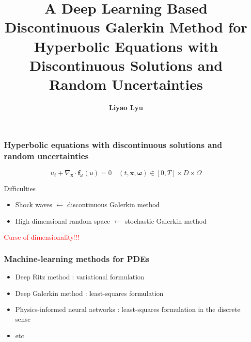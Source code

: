 \documentclass[aspectratio=169]{beamer}
\title[D2GM]{\bfseries A Deep Learning Based  Discontinuous Galerkin Method for Hyperbolic Equations with Discontinuous Solutions and Random Uncertainties}
\author{\textbf{Liyao Lyu }}
\begin{document}
\frame{\titlepage}



\begin{frame}
\frametitle{Hyperbolic equations with discontinuous solutions and random uncertainties}

\begin{equation*}
	u_t +\nabla_{\boldsymbol{x}} \cdot \boldsymbol{f}_{\omega}(u) = 0 \quad  (t,\boldsymbol{x},\boldsymbol{\omega})\in [0,T]\times D\times\Omega 
\end{equation*}


Difficulties
\begin{itemize}
	\item Shock waves $\longleftarrow$ discontinuous Galerkin method 
	\item High dimensional random space $\longleftarrow$ stochastic Galerkin method 
\end{itemize}

\begin{center}
	\textcolor{red}{Curse of dimensionality!!!}
\end{center}

\end{frame}

\begin{frame}
\frametitle{Machine-learning methods for PDEs}

\begin{itemize}
	\item Deep Ritz method : variational formulation
	\item Deep Galerkin method : least-squares formulation
	\item Physics-informed neural networks : least-squares formulation in the discrete sense
	\item etc
\end{itemize}

\end{frame}
\end{document}
